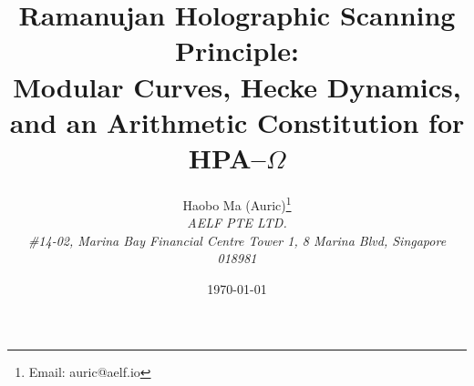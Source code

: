 \documentclass[11pt,a4paper]{article}
\title{Ramanujan Holographic Scanning Principle:\\ Modular Curves, Hecke Dynamics, and an Arithmetic Constitution for HPA--$\Omega$}
\author{Haobo Ma (Auric)\thanks{Email: auric@aelf.io} \\
\textit{AELF PTE LTD.} \\
\textit{\#14-02, Marina Bay Financial Centre Tower 1, 8 Marina Blvd, Singapore 018981}}
\date{\today}
\begin{document}
\maketitle














\FloatBarrier
\appendix


\FloatBarrier

\end{document}
